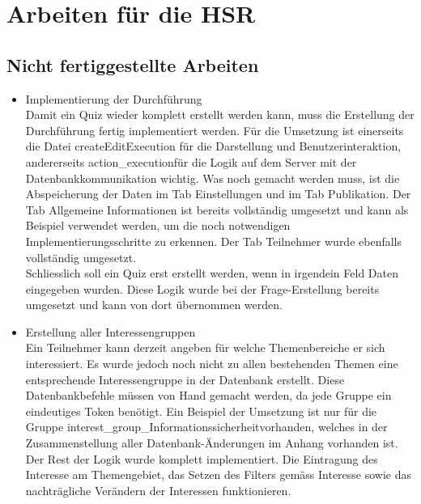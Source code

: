 


\section{Arbeiten für die HSR}
\label{sec:ArbeitenFuerDieHSR}

\subsection{Nicht fertiggestellte Arbeiten}
\label{subsec:NichtFertiggestellteArbeiten}

\begin{itemize}
	\item Implementierung der Durchführung\\
	Damit ein Quiz wieder komplett erstellt werden kann, muss die Erstellung der Durchführung fertig implementiert werden. Für die Umsetzung ist einerseits die Datei \glqq createEditExecution \grqq für die Darstellung und Benutzerinteraktion, andererseits \glqq action\_execution\grqq für die Logik auf dem Server mit der Datenbankkommunikation wichtig. Was noch gemacht werden muss, ist die Abspeicherung der Daten im Tab Einstellungen und im Tab Publikation. Der Tab Allgemeine Informationen ist bereits vollständig umgesetzt und kann als Beispiel verwendet werden, um die noch notwendigen Implementierungsschritte zu erkennen. Der Tab Teilnehmer wurde ebenfalls vollständig umgesetzt.\\
	Schliesslich soll ein Quiz erst erstellt werden, wenn in irgendein Feld Daten eingegeben wurden. Diese Logik wurde bei der Frage-Erstellung bereits umgesetzt und kann von dort übernommen werden.
	\item Erstellung aller Interessengruppen\\
	Ein Teilnehmer kann derzeit angeben für welche Themenbereiche er sich interessiert. Es wurde jedoch noch nicht zu allen bestehenden Themen eine entsprechende Interessengruppe in der Datenbank erstellt. Diese Datenbankbefehle müssen von Hand gemacht werden, da jede Gruppe ein eindeutiges Token benötigt. Ein Beispiel der Umsetzung ist nur für die Gruppe \glqq interest\_group\_Informationssicherheit\grqq vorhanden, welches in der Zusammenstellung aller Datenbank-Änderungen im Anhang vorhanden ist.
	Der Rest der Logik wurde komplett implementiert. Die Eintragung des Interesse am Themengebiet, das Setzen des Filters gemäss Interesse sowie das nachträgliche Verändern der Interessen funktionieren.
\end{itemize}



